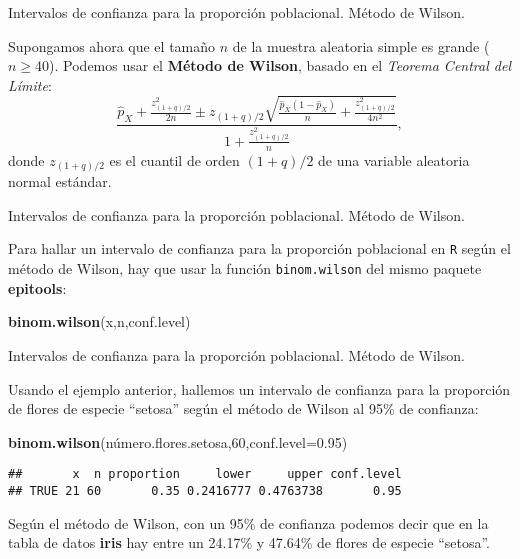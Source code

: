 \documentclass[ignorenonframetext,]{beamer}
\newenvironment{Shaded}{\begin{snugshade}}{\end{snugshade}}
\newcommand{\DataTypeTok}[1]{\textcolor[rgb]{0.13,0.29,0.53}{#1}}
\newcommand{\DecValTok}[1]{\textcolor[rgb]{0.00,0.00,0.81}{#1}}
\newcommand{\FloatTok}[1]{\textcolor[rgb]{0.00,0.00,0.81}{#1}}
\newcommand{\KeywordTok}[1]{\textcolor[rgb]{0.13,0.29,0.53}{\textbf{#1}}}
\newcommand{\NormalTok}[1]{#1}
\begin{document}
\begin{frame}{Intervalos de confianza para la proporción poblacional.
Método de Wilson.}
\protect\hypertarget{intervalos-de-confianza-para-la-proporcion-poblacional.-metodo-de-wilson.}{}

Supongamos ahora que el tamaño \(n\) de la muestra aleatoria simple es
grande (\(n\geq 40\)). Podemos usar el \textbf{Método de Wilson}, basado
en el \emph{Teorema Central del Límite}: \[
\frac{\widehat{p}_{X}+\frac{z_{(1+q)/2}^2}{2n}\pm z_{(1+q)/2}\sqrt{\frac{\widehat{p}_{X}(1-\widehat{p}_{X})}{n}+\frac{z_{(1+q)/2}^2}{4n^2}}}{1+\frac{z_{(1+q)/2}^2}{n}},
\] donde \(z_{(1+q)/2}\) es el cuantil de orden \((1+q)/2\) de una
variable aleatoria normal estándar.

\end{frame}

\begin{frame}[fragile]{Intervalos de confianza para la proporción
poblacional. Método de Wilson.}
\protect\hypertarget{intervalos-de-confianza-para-la-proporcion-poblacional.-metodo-de-wilson.-1}{}

Para hallar un intervalo de confianza para la proporción poblacional en
\texttt{R} según el método de Wilson, hay que usar la función
\texttt{binom.wilson} del mismo paquete \textbf{epitools}:

\begin{Shaded}
\begin{Highlighting}[]
\KeywordTok{binom.wilson}\NormalTok{(x,n,conf.level)}
\end{Highlighting}
\end{Shaded}

\end{frame}

\begin{frame}[fragile]{Intervalos de confianza para la proporción
poblacional. Método de Wilson.}
\protect\hypertarget{intervalos-de-confianza-para-la-proporcion-poblacional.-metodo-de-wilson.-2}{}

Usando el ejemplo anterior, hallemos un intervalo de confianza para la
proporción de flores de especie ``setosa'' según el método de Wilson al
95\% de confianza:

\begin{Shaded}
\begin{Highlighting}[]
\KeywordTok{binom.wilson}\NormalTok{(número.flores.setosa,}\DecValTok{60}\NormalTok{,}\DataTypeTok{conf.level=}\FloatTok{0.95}\NormalTok{)}
\end{Highlighting}
\end{Shaded}

\begin{verbatim}
##       x  n proportion     lower     upper conf.level
## TRUE 21 60       0.35 0.2416777 0.4763738       0.95
\end{verbatim}

Según el método de Wilson, con un 95\% de confianza podemos decir que en
la tabla de datos \textbf{iris} hay entre un 24.17\% y 47.64\% de flores
de especie ``setosa''.

\end{frame}
\end{document}
